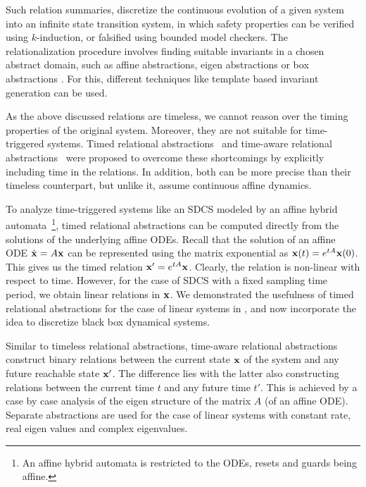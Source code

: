 Such relation summaries, discretize the continuous evolution of a
given system into an infinite state transition system, in which safety
properties can be verified using $k$-induction, or falsified using
bounded model checkers. The relationalization procedure involves
finding suitable invariants in a chosen abstract domain, such as
affine abstractions, eigen abstractions or box abstractions
\cite{Sankaranarayanan+Tiwari/2011/Relational}.  For this, different
techniques like template based invariant generation
\cite{Gulwani+Tiwari/2008/Constraint,
Colon+Sankaranarayanan+Sipma/03/Linear} can be used.


As the above discussed relations are timeless, we cannot reason over
the timing properties of the original system. Moreover, they are not
suitable for time-triggered systems. Timed relational
abstractions~\cite{zutshi2012timed} and time-aware relational
abstractions~\cite{mover2013time} were proposed to overcome these
shortcomings by explicitly including time in the relations. In
addition, both can be more precise than their timeless counterpart,
but unlike it, assume continuous affine dynamics.

To analyze time-triggered systems like an SDCS modeled by an affine
hybrid automata~\footnote{An affine hybrid automata is restricted to
the ODEs, resets and guards being affine.}, timed relational
abstractions can be computed directly from the solutions of the
underlying affine ODEs.  Recall that the solution of an affine ODE
$\dot{\mathbf{x}} = A\mathbf{x}$ can be represented using the matrix exponential as
$\mathbf{x}(t) = e^{tA}\mathbf{x}(0)$. This gives us the timed relation $\mathbf{x}' =
e^{tA}\mathbf{x}$.  Clearly, the relation is non-linear with respect to time.
However, for the case of SDCS with a fixed sampling time period, we
obtain linear relations in $\mathbf{x}$.  We demonstrated the usefulness of
timed relational abstractions for the case of linear systems
in \cite{zutshi2012timed}, and now incorporate the idea to discretize
black box dynamical systems.

Similar to timeless relational abstractions, time-aware relational
abstractions \cite{mover2013time} construct binary relations between
the current state $\mathbf{x}$ of the system and any future reachable state
$\mathbf{x}'$. The difference lies with the latter also constructing relations
between the current time $t$ and any future time $t'$. This is
achieved by a case by case analysis of the eigen structure of the
matrix $A$ (of an affine ODE). Separate abstractions are used for the
case of linear systems with constant rate, real eigen values and complex eigenvalues.

